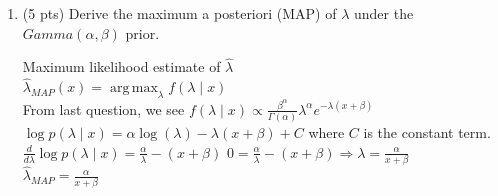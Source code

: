 \documentclass[11pt]{article}
\DeclareMathOperator*{\argmax}{arg\,max}
\begin{document}
\begin{enumerate}
\begin{answertext}{6cm}{}
\end{answertext} 



    \item (5 pts) Derive the maximum a posteriori (MAP) of \(\lambda\) under the \(Gamma\left(\alpha, \beta\right)\) prior. \\
\begin{answertext}{6cm}{}

Maximum likelihood estimate of $\hat{\lambda}$\\
$\hat{\lambda}_{MAP}(x) = \argmax_{\lambda} f(\lambda \mid x)$\\
From last question, we see $f(\lambda \mid x) \propto \frac{\beta^\alpha}{\Gamma(\alpha)}\lambda^\alpha e^{-\lambda(x+\beta)}$\\
$\log p(\lambda \mid x) = \alpha \log(\lambda) - \lambda(x + \beta) + C$ where $C$ is the constant term.\\
$\frac{d}{d\lambda}\log p(\lambda \mid x) = \frac{\alpha}{\lambda}-(x+\beta)$
$0 = \frac{\alpha}{\lambda}-(x+\beta) \Longrightarrow \lambda = \frac{\alpha}{x + \beta}$\\

$\hat{\lambda}_{MAP} = \frac{\alpha}{x+\beta}$

\end{answertext} 

\end{enumerate}
\end{document}
